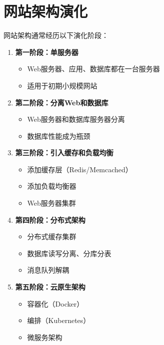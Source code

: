 \documentclass[12pt,UTF8]{ctexbook}
\begin{document}
\section{网站架构演化}
\label{sec:arch-evolution}

网站架构通常经历以下演化阶段：

\begin{enumerate}
    \item \textbf{第一阶段：单服务器}
    \begin{itemize}
        \item Web服务器、应用、数据库都在一台服务器
        \item 适用于初期小规模网站
    \end{itemize}
    
    \item \textbf{第二阶段：分离Web和数据库}
    \begin{itemize}
        \item Web服务器和数据库服务器分离
        \item 数据库性能成为瓶颈
    \end{itemize}
    
    \item \textbf{第三阶段：引入缓存和负载均衡}
    \begin{itemize}
        \item 添加缓存层（Redis/Memcached）
        \item 添加负载均衡器
        \item Web服务器集群
    \end{itemize}
    
    \item \textbf{第四阶段：分布式架构}
    \begin{itemize}
        \item 分布式缓存集群
        \item 数据库读写分离、分库分表
        \item 消息队列解耦
    \end{itemize}
    
    \item \textbf{第五阶段：云原生架构}
    \begin{itemize}
        \item 容器化（Docker）
        \item 编排（Kubernetes）
        \item 微服务架构
    \end{itemize}
\end{enumerate}
\end{document}
